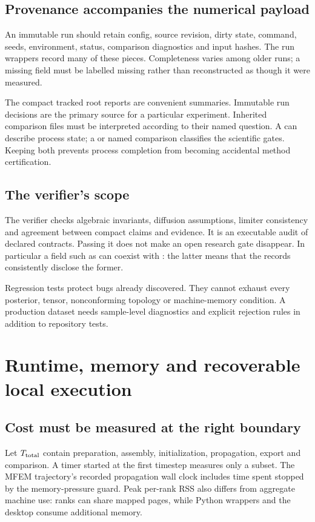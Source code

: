\section{Provenance accompanies the numerical payload}
An immutable run should retain config, source revision, dirty state, command, seeds, environment, status, comparison diagnostics and input hashes. The run wrappers record many of these pieces. Completeness varies among older runs; a missing field must be labelled missing rather than reconstructed as though it were measured.

The compact tracked root reports are convenient summaries. Immutable run decisions are the primary source for a particular experiment. Inherited comparison files must be interpreted according to their named question. A  can describe process state; a  or named comparison classifies the scientific gates. Keeping both prevents process completion from becoming accidental method certification.

\section{The verifier's scope}
The verifier checks algebraic invariants, diffusion assumptions, limiter consistency and agreement between compact claims and evidence. It is an executable audit of declared contracts. Passing it does not make an open research gate disappear. In particular a field such as  can coexist with : the latter means that the records consistently disclose the former.

Regression tests protect bugs already discovered. They cannot exhaust every posterior, tensor, nonconforming topology or machine-memory condition. A production dataset needs sample-level diagnostics and explicit rejection rules in addition to repository tests.

\chapter{Runtime, memory and recoverable local execution}
\section{Cost must be measured at the right boundary}
Let $T_{\rm total}$ contain preparation, assembly, initialization, propagation, export and comparison. A timer started at the first timestep measures only a subset. The MFEM trajectory's recorded propagation wall clock includes time spent stopped by the memory-pressure guard. Peak per-rank RSS also differs from aggregate machine use: ranks can share mapped pages, while Python wrappers and the desktop consume additional memory.

